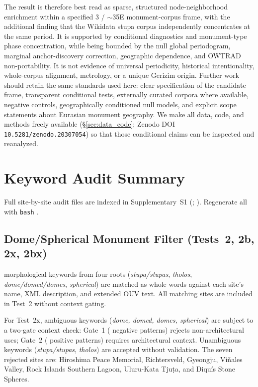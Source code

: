 The result is therefore best read as sparse, structured
node-neighborhood enrichment within a specified 3\textdegree{} /
$\sim$35\textdegree{}E monument-corpus frame, with the additional finding
that the Wikidata stupa corpus independently concentrates at the same
period. It is supported by conditional diagnostics and monument-type
phase concentration, while being bounded by the null global
periodogram, marginal anchor-discovery correction, geographic
dependence, and OWTRAD non-portability. It is not evidence of
universal periodicity,
historical intentionality, whole-corpus alignment, metrology, or a
unique Gerizim origin. Further work should retain the same standards
used here: clear specification of the candidate frame, transparent
conditional tests, externally curated corpora where available,
negative controls, geographically conditioned null models, and
explicit scope statements about Eurasian monument geography. We make
all data, code, and methods freely available
(\S\ref{sec:data_code}; Zenodo DOI
\texttt{10.5281/zenodo.20307054}) so that those conditional claims can
be inspected and reanalyzed.


\appendix

\section{Keyword Audit Summary}
\label{sec:kwdaudit}

Full site-by-site audit files are indexed in Supplementary~S1
(; \citealt{tenenbaum2026audit}).
Regenerate all with \texttt{bash} .

\subsection{Dome/Spherical Monument Filter (Tests~2, 2b, 2x, 2bx)}
\label{sec:kwdaudit_dome}

\NcircKeywords{} morphological keywords from four roots
(\textit{stupa/stupas}, \textit{tholos}, \textit{dome/domed/domes},
\textit{spherical}) are matched as whole words against each site's
name, XML description, and extended OUV text. All \NcircTotal{} matching
sites are included in Test~2 without context gating.

For Test~2x, ambiguous keywords (\textit{dome, domed, domes, spherical})
are subject to a two-gate context check: Gate~1 (\NdomeGateNeg{} negative
patterns) rejects non-architectural uses; Gate~2 (\NdomeGatePos{} positive
patterns) requires architectural context. Unambiguous keywords
(\textit{stupa/stupas}, \textit{tholos}) are accepted without validation.
The seven
rejected sites are: Hiroshima Peace Memorial, Richtersveld, Gyeongju,
Vi\~{n}ales Valley, Rock Islands Southern Lagoon, Uluru-Kata Tju\d{t}a,
and Diqu\'{i}s Stone Spheres.

